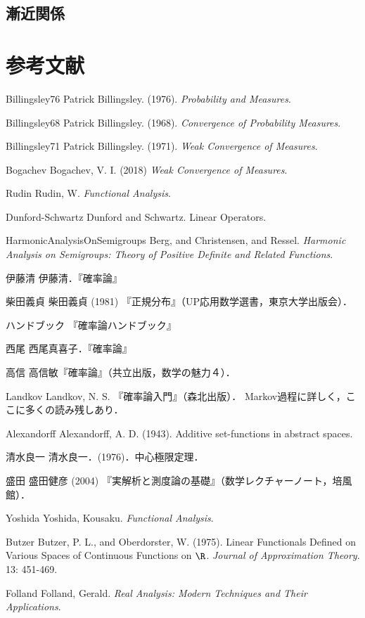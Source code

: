 \documentclass[uplatex,dvipdfmx]{jsreport}
\begin{document}
\section{漸近関係}



\chapter{参考文献}


\begin{thebibliography}{99}
    \item{Billingsley76}
    Patrick Billingsley. (1976). \textit{Probability and Measures}.
    \item{Billingsley68}
    Patrick Billingsley. (1968). \textit{Convergence of Probability Measures}.
    \item{Billingsley71}
    Patrick Billingsley. (1971). \textit{Weak Convergence of Measures}.
    \item{Bogachev}
    Bogachev, V. I. (2018) \textit{Weak Convergence of Measures}.
    \item{Rudin}
    Rudin, W. \textit{Functional Analysis}.
    \item{Dunford-Schwartz}
    Dunford and Schwartz. Linear Operators.
    \item{HarmonicAnalysisOnSemigroups}
    Berg, and Christensen, and Ressel. \textit{Harmonic Analysis on Semigroups: Theory of Positive Definite and Related Functions}.

    \item{伊藤清}
    伊藤清．『確率論』
    \item{柴田義貞}
    柴田義貞 (1981) 『正規分布』（UP応用数学選書，東京大学出版会）．
    \item{ハンドブック}
    『確率論ハンドブック』
    \item{西尾}
    西尾真喜子．『確率論』
    \item{高信}
    高信敏『確率論』（共立出版，数学の魅力４）．
    \item{Landkov}
    Landkov, N. S. 『確率論入門』（森北出版）．
    Markov過程に詳しく，ここに多くの読み残しあり．
    \item{Alexandorff}
    Alexandorff, A. D. (1943). Additive set-functions in abstract spaces.
    \item{清水良一}
    清水良一．(1976)．中心極限定理．
    \item{盛田}
    盛田健彦 (2004) 『実解析と測度論の基礎』（数学レクチャーノート，培風館）．
    \item{Yoshida}
    Yoshida, Kousaku. \textit{Functional Analysis}.
    \item{Butzer}
    Butzer, P. L., and Oberdorster, W. (1975). Linear Functionals Defined on Various Spaces of Continuous Functions on $\R$. \textit{Journal of Approximation Theory}. 13: 451-469.
    \item{Folland}
    Folland, Gerald. \textit{Real Analysis: Modern Techniques and Their Applications}.


\end{thebibliography}
\end{document}
